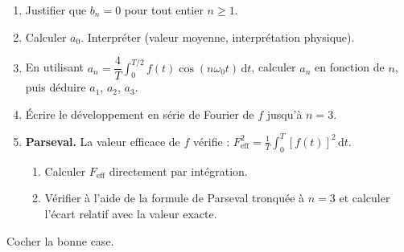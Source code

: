 \documentclass[a4paper,11pt]{article}
\begin{document}
\begin{enumerate}[label=\textbf{\arabic*.}]
  \item Justifier que $b_n = 0$ pour tout entier $n \geq 1$.
  \begin{tcolorbox}[reponsebox, height=1cm]\end{tcolorbox}

  \item Calculer $a_0$. Interpréter (valeur moyenne, interprétation physique).
  \begin{tcolorbox}[reponsebox, height=2.5cm]\end{tcolorbox}

  \item En utilisant $a_n = \dfrac{4}{T}\displaystyle\int_0^{T/2} f(t)\cos(n\omega_0 t)\,\mathrm{d}t$,
        calculer $a_n$ en fonction de $n$, puis déduire $a_1$, $a_2$, $a_3$.
  \begin{tcolorbox}[reponsebox, height=3.5cm]\end{tcolorbox}

  \item Écrire le développement en série de Fourier de $f$ jusqu'à $n = 3$.
  \begin{tcolorbox}[reponsebox, height=2cm]\end{tcolorbox}

  \item \textbf{Parseval.} La valeur efficace de $f$ vérifie :
        $\displaystyle F_{\mathrm{eff}}^2 = \frac{1}{T}\int_0^T [f(t)]^2\,\mathrm{d}t$.
  \begin{enumerate}[label=\textbf{\alph*)}]
    \item Calculer $F_{\mathrm{eff}}$ directement par intégration.
    \begin{tcolorbox}[reponsebox, height=2.5cm]\end{tcolorbox}

    \item Vérifier à l'aide de la formule de Parseval tronquée à $n = 3$ et calculer l'écart relatif avec la valeur exacte.
    \begin{tcolorbox}[reponsebox, height=2.5cm]\end{tcolorbox}
  \end{enumerate}
\end{enumerate}

\newpage

\begin{tcolorbox}[exobox={Exercice 3 — Vrai ou Faux ?}]
Cocher la bonne case.
\end{tcolorbox}
\end{document}
